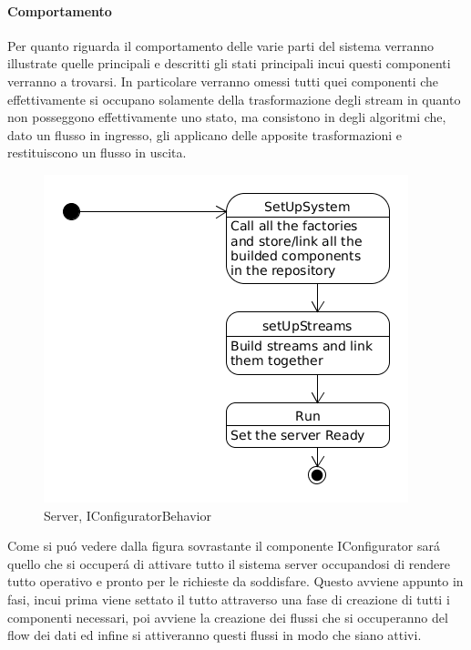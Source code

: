 \afterpage{\clearpage}

\newpage


\paragraph{Comportamento}

Per quanto riguarda il comportamento delle varie parti del sistema verranno illustrate quelle principali e descritti gli stati principali incui questi componenti verranno a trovarsi. In particolare verranno omessi tutti quei componenti che effettivamente si occupano solamente della trasformazione degli stream in quanto non posseggono effettivamente uno stato, ma consistono in degli algoritmi che, dato un flusso in ingresso, gli applicano delle apposite trasformazioni e restituiscono un flusso in uscita.

\begin{figure}[h]
\centering
\includegraphics[width=\textwidth]{Figures/LogicArchitecture/Server/IConfiguratorBehavior}
\caption{Server, IConfiguratorBehavior}
\end{figure}

Come si pu\'o vedere dalla figura sovrastante il componente IConfigurator sar\'a quello che si occuper\'a di attivare tutto il sistema server occupandosi di rendere tutto operativo e pronto per le richieste da soddisfare. Questo avviene appunto in fasi, incui prima viene settato il tutto attraverso una fase di creazione di tutti i componenti necessari, poi avviene la creazione dei flussi che si occuperanno del flow dei dati ed infine si attiveranno questi flussi in modo che siano attivi.



